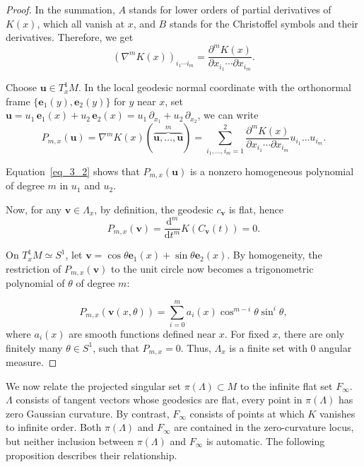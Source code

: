 \documentclass[reqno,11pt]{article}
\theoremstyle{definition}
\theoremstyle{remark}
\numberwithin{equation}{section}
\begin{document}
\begin{proof}
	In the summation, $A$ stands for lower orders of partial derivatives of $K(x)$, which all vanish at $x$, and $B$ stands for the Christoffel symbols and their derivatives. Therefore, we get
	\begin{equation}\label{eq_3_1}
		{(\nabla^{m} K(x))}_{i_1\cdots i_m}=\dfrac{\partial^m K(x)}{\partial x_{i_1}\cdots\partial x_{i_m}}.
	\end{equation}

	Choose $\bm{u}\in T^{1}_x M$. In the local geodesic normal coordinate with the orthonormal frame $\{\bm{e}_{1}(y),\bm{e}_{2}(y)\}$ for $y$ near $x$, set $\bm{u}=u_{1}\,\bm{e}_{1}(x)+u_{2}\,\bm{e}_{2}(x)=u_{1}\,\partial_{x_1}+u_{2}\,\partial_{x_2}$, we can write
	\begin{equation}\label{eq_3_2}
		P_{m,x}(\bm{u})=\nabla^{m} K(x)(\overbrace{\bm{u},\ldots,\bm{u}}^{m})=\sum_{i_{1},\ldots,i_{m}=1}^{2}\dfrac{\partial^{m}K(x)}{\partial x_{i_1}\cdots\partial x_{i_m}}u_{i_1}\ldots u_{i_m}.
	\end{equation}

	Equation~\ref{eq_3_2} shows that $P_{m,x}(\bm{u})$ is a nonzero homogeneous polynomial of degree $m$ in $u_1$ and $u_2$.

	Now, for any $\bm{v}\in \Lambda_x$, by definition, the geodesic $c_{\bm{v}}$ is flat, hence
	\begin{displaymath}
		P_{m,x}(\bm{v})=\dfrac{\mathrm{d}^{m}}{\mathrm{d}t^{m}}K(C_{\bm{v}}(t))=0.
	\end{displaymath}

	On $T^1_x M\simeq S^1$, let $\bm{v}=\cos\theta\bm{e}_1(x)+\sin\theta\bm{e}_2(x)$. By homogeneity, the restriction of $P_{m,x}(\bm{v})$ to the unit circle now becomes a trigonometric polynomial of $\theta$ of degree $m$:

	\begin{equation}\label{eq_3_3}
		P_{m,x}(\bm{v}(x,\theta))=\sum_{i=0}^{m} a_{i}(x)\cos^{m-i}\theta\sin^{i}\theta,
	\end{equation}
	where $a_i(x)$ are smooth functions defined near $x$. For fixed $x$, there are only finitely many $\theta\in S^{1}$, such that $P_{m,x}=0$. Thus, $\Lambda_x$ is a finite set with $0$ angular measure.
\end{proof}

We now relate the projected singular set $\pi(\Lambda)\subset M$ to the infinite flat set $F_{\infty}$. $\Lambda$ consists of tangent vectors whose geodesics are flat, every point in $\pi(\Lambda)$ has zero Gaussian curvature. By contrast, $F_{\infty}$ consists of points at which $K$ vanishes to infinite order. Both $\pi(\Lambda)$ and $F_{\infty}$ are contained in the zero-curvature locus, but neither inclusion between $\pi(\Lambda)$ and $F_{\infty}$ is automatic. The following
proposition describes their relationship.
\end{document}
